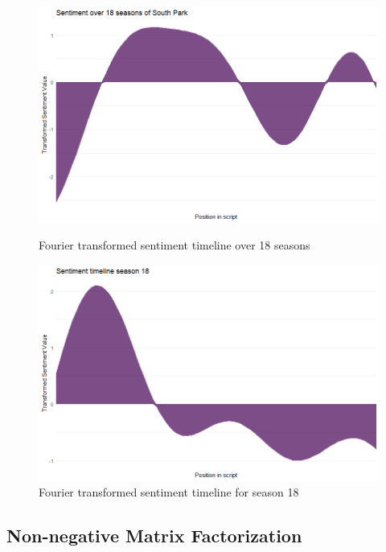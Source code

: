 \documentclass[10pt,a4paper]{article}
\begin{document}
	
	
	\begin{figure}[!h]
  \centering
  \begin{minipage}[b]{0.45\textwidth}
    \includegraphics[width=\textwidth]{images/sentimentAll.png}
    \caption{Fourier transformed sentiment timeline over 18 seasons}
	\label{fig:sentimentInitAll}
  \end{minipage}
  \hfill
  \begin{minipage}[b]{0.5\textwidth}
    \includegraphics[width=\textwidth]{images/sentiment18.png}
    \caption{Fourier transformed sentiment timeline for season 18}
	\label{fig:sentimentInit18}
  \end{minipage}
\end{figure}		
			
	\subsection{Non-negative Matrix Factorization}
	
\end{document}
